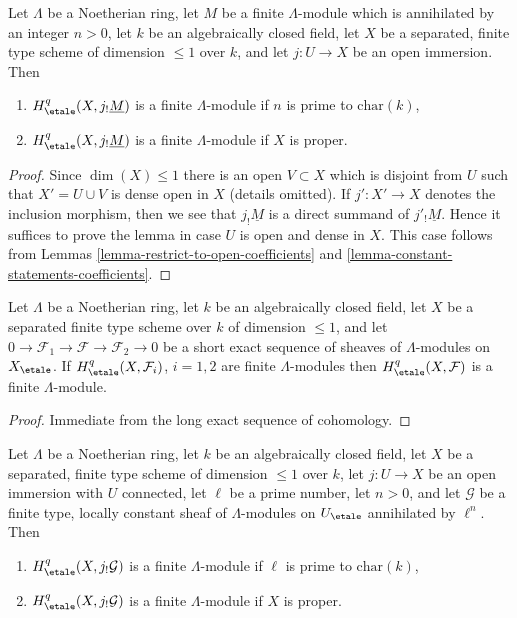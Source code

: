 \begin{lemma}
\label{lemma-somewhat-easier-coefficients}
Let $\Lambda$ be a Noetherian ring, let $M$ be a finite $\Lambda$-module which
is annihilated by an integer $n > 0$, let $k$ be an algebraically closed field,
let $X$ be a separated, finite type scheme of dimension $\leq 1$ over $k$, and
let $j : U \to X$ be an open immersion. Then
\begin{enumerate}
\item $H^q_\etale(X, j_!\underline{M})$ is a finite $\Lambda$-module
if $n$ is prime to $\text{char}(k)$,
\item $H^q_\etale(X, j_!\underline{M})$ is a finite $\Lambda$-module
if $X$ is proper.
\end{enumerate}
\end{lemma}

\begin{proof}
Since $\dim(X) \leq 1$ there is an open $V \subset X$ which is disjoint from
$U$ such that $X' = U \cup V$ is dense open in $X$ (details omitted).
If $j' : X' \to X$ denotes the inclusion morphism, then we see that
$j_!\underline{M}$ is a direct summand of $j'_!\underline{M}$.
Hence it suffices to prove the lemma in case $U$ is open and dense in $X$.
This case follows from Lemmas \ref{lemma-restrict-to-open-coefficients}
and \ref{lemma-constant-statements-coefficients}.
\end{proof}

\begin{lemma}
\label{lemma-ses-statements-coefficients}
Let $\Lambda$ be a Noetherian ring, let $k$ be an algebraically closed field,
let $X$ be a separated finite type scheme over $k$ of dimension $\leq 1$, and
let $0 \to \mathcal{F}_1 \to \mathcal{F} \to \mathcal{F}_2 \to 0$
be a short exact sequence of sheaves of $\Lambda$-modules on $X_\etale$. If
$H^q_\etale(X, \mathcal{F}_i)$, $i = 1, 2$ are finite $\Lambda$-modules
then $H^q_\etale(X, \mathcal{F})$ is a finite $\Lambda$-module.
\end{lemma}

\begin{proof}
Immediate from the long exact sequence of cohomology.
\end{proof}

\begin{lemma}
\label{lemma-vanishing-easier-coefficients}
Let $\Lambda$ be a Noetherian ring, let $k$ be an algebraically closed field,
let $X$ be a separated, finite type scheme of dimension $\leq 1$ over $k$,
let $j : U \to X$ be an open immersion with $U$ connected, let
$\ell$ be a prime number, let $n > 0$, and let $\mathcal{G}$ be a finite type,
locally constant sheaf of $\Lambda$-modules on $U_\etale$ annihilated by
$\ell^n$. Then
\begin{enumerate}
\item $H^q_\etale(X, j_!\mathcal{G})$ is a finite $\Lambda$-module
if $\ell$ is prime to $\text{char}(k)$,
\item $H^q_\etale(X, j_!\mathcal{G})$ is a finite $\Lambda$-module
if $X$ is proper.
\end{enumerate}
\end{lemma}


